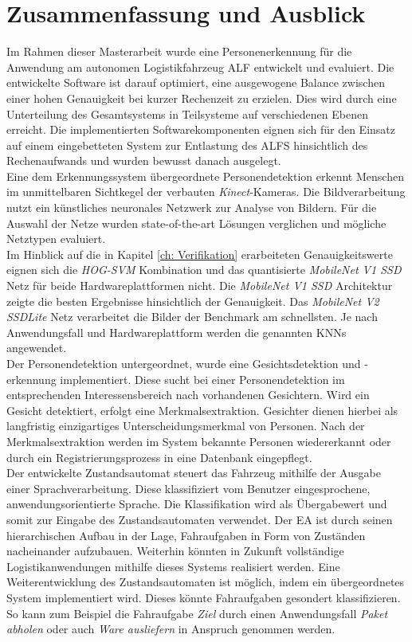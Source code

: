 \chapter{Zusammenfassung und Ausblick}
\label{Fazit und Ausblick}
	
Im Rahmen dieser Masterarbeit wurde eine Personenerkennung für die Anwendung am autonomen Logistikfahrzeug ALF entwickelt und evaluiert. Die entwickelte Software ist darauf optimiert, eine ausgewogene Balance zwischen einer hohen Genauigkeit bei kurzer Rechenzeit zu erzielen. Dies wird durch eine Unterteilung des Gesamtsystems in Teilsysteme auf verschiedenen Ebenen erreicht. Die implementierten Softwarekomponenten eignen sich für den Einsatz auf einem eingebetteten System zur Entlastung des ALFS hinsichtlich des Rechenaufwands und wurden bewusst danach ausgelegt.\\

Eine dem Erkennungssystem übergeordnete Personendetektion erkennt Menschen im unmittelbaren Sichtkegel der verbauten \textit{Kinect}-Kameras. Die Bildverarbeitung nutzt ein künstliches neuronales Netzwerk zur Analyse von Bildern. Für die Auswahl der Netze wurden state-of-the-art Lösungen verglichen und mögliche Netztypen evaluiert.\\

Im Hinblick auf die in Kapitel \ref{ch: Verifikation} erarbeiteten Genauigkeitswerte eignen sich die \textit{HOG-SVM} Kombination und das quantisierte \textit{MobileNet V1 SSD} Netz für beide Hardwareplattformen nicht. Die \textit{MobileNet V1 SSD} Architektur zeigte die besten Ergebnisse hinsichtlich der Genauigkeit. Das \textit{MobileNet V2 SSDLite} Netz verarbeitet die Bilder der Benchmark am schnellsten. Je nach Anwendungsfall und Hardwareplattform werden die genannten KNNs angewendet.     \\

Der Personendetektion untergeordnet, wurde eine Gesichtsdetektion und -erkennung implementiert. Diese sucht bei einer Personendetektion im entsprechenden Interessensbereich nach vorhandenen Gesichtern. Wird ein Gesicht detektiert, erfolgt eine Merkmalsextraktion. Gesichter dienen hierbei als langfristig einzigartiges Unterscheidungsmerkmal von Personen. Nach der Merkmalsextraktion werden im System bekannte Personen wiedererkannt oder durch ein Registrierungsprozess in eine Datenbank eingepflegt.\\
\newpage
Der entwickelte Zustandsautomat steuert das Fahrzeug mithilfe der Ausgabe einer Sprachverarbeitung. Diese klassifiziert vom Benutzer eingesprochene, anwendungsorientierte Sprache. Die Klassifikation wird als Übergabewert und somit zur Eingabe des Zustandsautomaten verwendet. Der EA ist durch seinen hierarchischen Aufbau in der Lage, Fahraufgaben in Form von Zuständen nacheinander aufzubauen. Weiterhin könnten in Zukunft vollständige Logistikanwendungen mithilfe dieses Systems realisiert werden. Eine Weiterentwicklung des Zustandsautomaten ist möglich, indem ein übergeordnetes System implementiert wird. Dieses könnte Fahraufgaben gesondert klassifizieren. So kann zum Beispiel die Fahraufgabe \textit{Ziel} durch einen Anwendungsfall \textit{Paket abholen} oder auch \textit{Ware ausliefern} in Anspruch genommen werden.\\

